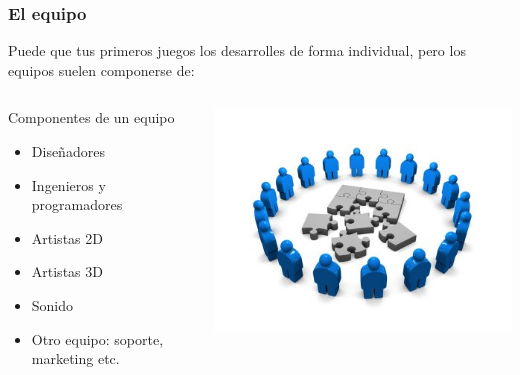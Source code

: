 \begin{frame}
	\frametitle{El equipo}
	
	Puede que tus primeros juegos los desarrolles de forma individual,
	pero los equipos suelen componerse de:
		
	\begin{columns}[c]
	\column{200pt}	
	
	\begin{block}{Componentes de un equipo}
		\begin{itemize}
			\item Diseñadores
			\item Ingenieros y programadores
			\item Artistas 2D
			\item Artistas 3D
			\item Sonido
			\item Otro equipo: soporte, marketing etc.
		\end{itemize}            
	\end{block}
	
	\column{100pt}
	\begin{center}
	    \includegraphics[scale=0.3]{img/collaborate.jpg}
	\end{center}
	
	
	\end{columns}
\end{frame}

